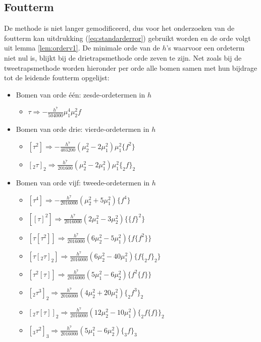 \documentclass[12pt]{article}
\begin{document}
\subsection{Foutterm}
De methode is niet langer gemodificeerd, dus voor het onderzoeken van de foutterm kan uitdrukking (\ref{eq:standarderror}) gebruikt worden en de orde volgt uit lemma \ref{lem:orderv1}. De minimale orde van de \(h\)'s waarvoor een ordeterm niet nul is, blijkt bij de drietrapsmethode orde zeven te zijn. Net zoals bij de tweetrapsmethode worden hieronder per orde alle bomen samen met hun bijdrage tot de leidende foutterm opgelijst:
\begin{itemize}
    \item Bomen van orde één: zesde-ordetermen in \(h\)
    \begin{itemize}
        \item \(\tau\Rightarrow-\frac{h^7}{504000}\mu_1^4\mu_2^2f\)
    \end{itemize}
    \item Bomen van orde drie: vierde-ordetermen in \(h\)
    \begin{itemize}
         \item \([\tau^2]\Rightarrow-\frac{h^7}{403200}\left(\mu_2^2-2\mu_1^2\right)\mu_1^2\{f^2\}\)
         \item \([_2\tau]_2\Rightarrow\frac{h^7}{201600}\left(\mu_2^2-2\mu_1^2\right)\mu_1^2\{_2f\}_2\)
    \end{itemize}
    \item Bomen van orde vijf: tweede-ordetermen in \(h\)
    \begin{itemize}
        \item \([\tau^4]\Rightarrow-\frac{h^7}{2016000}(\mu_2^2+5\mu_1^2)\{f^4\}\)
        \item \([[\tau]^2]\Rightarrow\frac{h^7}{2016000}(2\mu_1^2-3\mu_2^2)\{\{f\}^2\}\)
        \item \([\tau[\tau^2]]\Rightarrow\frac{h^7}{2016000}(6\mu_2^2-5\mu_1^2)\{f\{f^2\}\}\)
        \item \([\tau[_2\tau]_2]\Rightarrow\frac{h^7}{2016000}(6\mu_2^2-40\mu_1^2)\{f\{_2f\}_2\}\)
        \item \([\tau^2[\tau]]\Rightarrow\frac{h^7}{2016000}(5\mu_1^2-6\mu_2^2)\{f^2\{f\}\}\)
        \item \([_2\tau^3]_2\Rightarrow\frac{h^7}{2016000}(4\mu_2^2+20\mu_1^2)\{_2f^3\}_2\)
        \item \([_2\tau[\tau]]_2\Rightarrow\frac{h^7}{2016000}(12\mu_2^2-10\mu_1^2)\{_2f\{f\}\}_2\)
        \item \([_3\tau^2]_3\Rightarrow\frac{h^7}{2016000}(5\mu_1^2-6\mu_2^2)\{_3f\}_3\)

\end{itemize}
\end{itemize}
\end{document}
